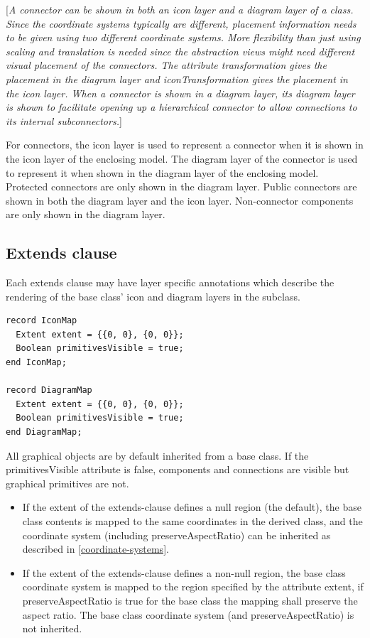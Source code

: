 \documentclass[10pt,a4paper]{report}
\def\doublelabel#1{\label{#1}}
\begin{document}
{[}\emph{A connector can be shown in both an icon layer and a diagram
layer of a class. Since the coordinate systems typically are different,
placement information needs to be given using two different coordinate
systems. More flexibility than just using scaling and translation is
needed since the abstraction views might need different visual placement
of the connectors. The attribute transformation gives the placement in
the diagram layer and iconTransformation gives the placement in the icon
layer. When a connector is shown in a diagram layer, its diagram layer
is shown to facilitate opening up a hierarchical connector to allow
connections to its internal subconnectors.}{]}

For connectors, the icon layer is used to represent a connector when it
is shown in the icon layer of the enclosing model. The diagram layer of
the connector is used to represent it when shown in the diagram layer of
the enclosing model. Protected connectors are only shown in the diagram
layer. Public connectors are shown in both the diagram layer and the
icon layer. Non-connector components are only shown in the diagram
layer.

\subsection{Extends clause}\doublelabel{extends-clause}

Each extends clause may have layer specific annotations which describe
the rendering of the base class' icon and diagram layers in the
subclass.

\begin{lstlisting}[language=modelica]
record IconMap
  Extent extent = {{0, 0}, {0, 0}};
  Boolean primitivesVisible = true;
end IconMap;

record DiagramMap
  Extent extent = {{0, 0}, {0, 0}};
  Boolean primitivesVisible = true;
end DiagramMap;
\end{lstlisting}
All graphical objects are by default inherited from a base class. If the
primitivesVisible attribute is false, components and connections are
visible but graphical primitives are not.

\begin{itemize}
\item
  If the extent of the extends-clause defines a null region (the
  default), the base class contents is mapped to the same coordinates in
  the derived class, and the coordinate system (including
  preserveAspectRatio) can be inherited as described in 
  \ref{coordinate-systems}.
\item
  If the extent of the extends-clause defines a non-null region, the
  base class coordinate system is mapped to the region specified by the
  attribute extent, if preserveAspectRatio is true for the base class
  the mapping shall preserve the aspect ratio. The base class coordinate
  system (and preserveAspectRatio) is not inherited.
\end{itemize}
\end{document}
